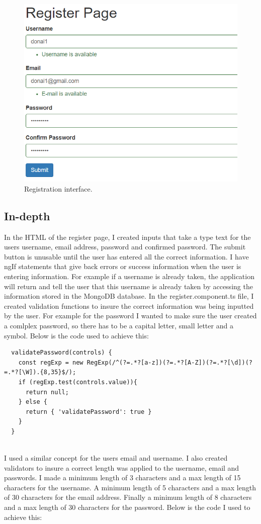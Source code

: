 \begin{figure}[H]
\centering
\includegraphics[]{img/UserInterface.png}
\caption{Registration interface.}
\end{figure}


\subsection{In-depth}
In the HTML of the register page, I created inputs that take a type text for the users username, email address, password and confirmed password. The submit button is unusable until the user has entered all the correct information. I have ngIf statements that give back errors or success information when the user is entering information. For example if a username is already taken, the application will return and tell the user that this username is already taken by accessing the information stored in the MongoDB database. In the register.component.ts file, I created validation functions to insure the correct information was being inputted by the user. For example for the password I wanted to make sure the user created a comlplex password, so there has to be a capital letter, small letter and a symbol. Below is the code used to achieve this:

\begin{lstlisting}
  validatePassword(controls) {
    const regExp = new RegExp(/^(?=.*?[a-z])(?=.*?[A-Z])(?=.*?[\d])(?=.*?[\W]).{8,35}$/);
    if (regExp.test(controls.value)){
      return null;
    } else {
      return { 'validatePassword': true }
    }
  }
  
\end{lstlisting}
I used a similar concept for the users email and username. I also created validators to insure a correct length was applied to the username, email and passwords. I made a minimum length of 3 characters and a max length of 15 characters for the username. A minimum length of 5 characters and a max length of 30 characters for the email address. Finally a minimum length of 8 characters and a max length of 30 characters for the password. Below is the code I used to achieve this:

